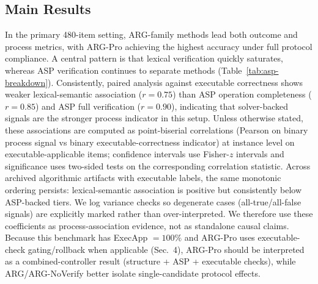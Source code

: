 \documentclass{article}
\begin{document}
\subsection{Main Results}
In the primary 480-item setting, ARG-family methods lead both outcome and process metrics, with ARG-Pro achieving the highest accuracy under full protocol compliance. A central pattern is that lexical verification quickly saturates, whereas ASP verification continues to separate methods (Table~\ref{tab:asp-breakdown}). Consistently, paired analysis against executable correctness shows weaker lexical-semantic association (\(r=0.75\)) than ASP operation completeness (\(r=0.85\)) and ASP full verification (\(r=0.90\)), indicating that solver-backed signals are the stronger process indicator in this setup.
Unless otherwise stated, these associations are computed as point-biserial correlations (Pearson on binary process signal vs binary executable-correctness indicator) at instance level on executable-applicable items; confidence intervals use Fisher-\(z\) intervals and significance uses two-sided tests on the corresponding correlation statistic.
Across archived algorithmic artifacts with executable labels, the same monotonic ordering persists: lexical-semantic association is positive but consistently below ASP-backed tiers. We log variance checks so degenerate cases (all-true/all-false signals) are explicitly marked rather than over-interpreted. We therefore use these coefficients as process-association evidence, not as standalone causal claims.
Because this benchmark has ExecApp \(=100\%\) and ARG-Pro uses executable-check gating/rollback when applicable (Sec.~4), ARG-Pro should be interpreted as a combined-controller result (structure + ASP + executable checks), while ARG/ARG-NoVerify better isolate single-candidate protocol effects.
\end{document}
